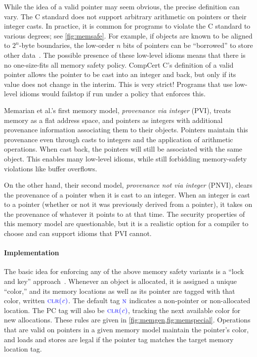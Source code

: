 \documentclass{llncs}
\begin{document}
While the idea of a valid pointer may seem obvious, the precise definition can vary. The C standard
does not support arbitrary arithmetic on pointers or their integer casts.  In practice, it is common for programs to violate the
C standard to various degrees; see \cref{fig:memsafe}. For example, if objects are known to be aligned to \(2^n\)-byte boundaries,
the low-order \(n\) bits of pointers can be ``borrowed'' to store other data~\cite{Memarian16:DeFacto}.
The possible presence of these low-level idioms means that there is no one-size-fits all memory safety policy.
CompCert C's definition of a valid pointer allows the pointer to be cast into an integer and back, but only if its value
does not change in the interim. This is very strict! Programs that use low-level idioms
would failstop if run under a policy that enforces this.

Memarian et al.'s first memory model, {\em provenance via integer} (PVI), treats memory
as a flat address space, and pointers as integers with additional provenance information
associating them to their objects. Pointers maintain this provenance even through casts to
integers and the application of arithmetic operations. When cast back, the pointers will still
be associated with the same object. This enables many low-level idioms, while still forbidding
memory-safety violations like buffer overflows.

On the other hand, their second model, {\em provenance not via integer} (PNVI), clears the
provenance of a pointer when it is cast to an integer. When an integer is cast to a pointer
(whether or not it was previously derived from a pointer), it takes on the provenance of whatever
it points to at that time. The security properties of this memory model are questionable, but
it is a realistic option for a compiler to choose and can support idioms that PVI cannot.

\paragraph*{Implementation}

The basic idea for enforcing any of the above memory safety variants is a ``lock and key'' approach~\cite{Clause07:MemsafeTainting,Azevedo+15}.
Whenever an object is allocated, it is assigned a unique ``color,'' and its memory locations as well
as its pointer are tagged with that color, written \(\textnormal{\color{blue} \sc clr}{\color{blue}(\mathit{c})}\).
The default tag \(\textnormal{\color{blue} \sc n}\) indicates a non-pointer or non-allocated location.
The PC tag will also be \(\textnormal{\color{blue} \sc clr}{\color{blue}(\mathit{c})}\),
tracking the next available color for new allocations. These rules are given in \cref{fig:memgen,fig:memspecial}.
Operations that are valid on pointers in a given memory model
maintain the pointer's color, and loads and stores are legal if the pointer tag matches the target memory
location tag. 
\end{document}
